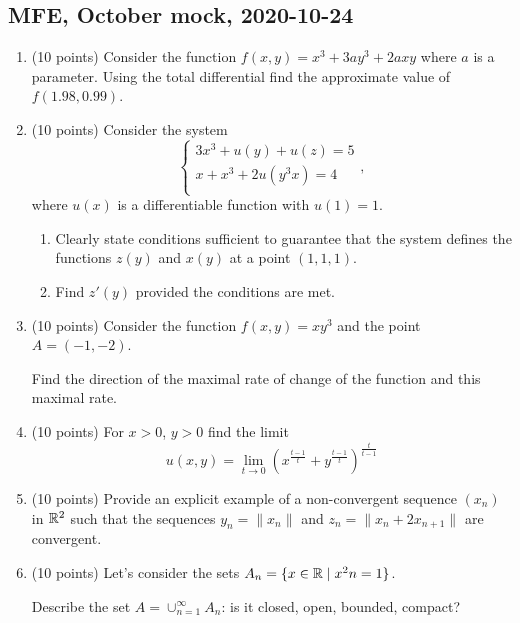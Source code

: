 
\subsection{MFE, October mock, 2020-10-24}


\begin{enumerate}

\item (10 points) Consider the function $f(x, y) = x^3 +3a y^3 + 2axy$ where $a$ is a parameter. 
  Using the total differential find the approximate value of $f(1.98, 0.99)$.

  \item (10 points) Consider the system
  \[
  \begin{cases}
  3x^3 + u(y) + u(z) = 5 \\
  x + x^3 + 2u(y^3x) = 4 \\
  \end{cases},
  \]
  where $u(x)$ is a differentiable function with $u(1)=1$. 


  \begin{enumerate}
    \item Clearly state conditions sufficient to guarantee that the system defines the functions $z(y)$ and $x(y)$ at a point $(1, 1, 1)$. 
    \item Find $z'(y)$ provided the conditions are met.
 \end{enumerate}

 \item (10 points) Consider the function $f (x, y) = xy^3$  and the point $A = (-1, -2)$.

 Find the direction of the maximal rate of change of the function and this maximal rate.


\item (10 points) For $x>0$, $y>0$ find the limit 
\[
u(x,y) = \lim_{t\to 0} \left(x^{\frac{t-1}{t}} + y^{\frac{t-1}{t}}  \right)^{\frac{t}{t-1}}
\]

\item (10 points) Provide an explicit example of a non-convergent sequence $(x_n)$ in $\mathbb{R}^2$ 
such that the sequences $y_n = \| x_n \|$ and $z_n = \| x_n  + 2x_{n+1}\|$ are convergent.

\item (10 points) Let's consider the sets $A_n = \{ x\in \mathbb{R} \mid x^2 n = 1\}$.

Describe the set $A = \cup_{n=1}^{\infty} A_n$: is it closed, open, bounded, compact?




\end{enumerate}

